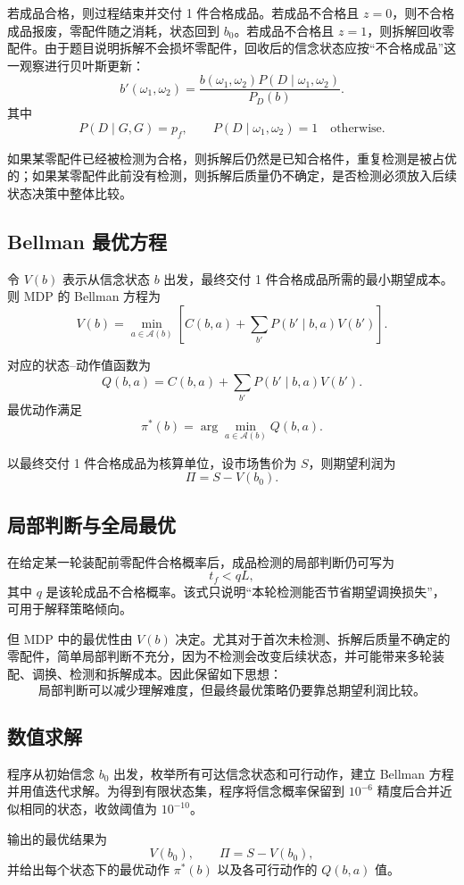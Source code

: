 若成品合格，则过程结束并交付 1 件合格成品。若成品不合格且 \(z=0\)，则不合格成品报废，零配件随之消耗，状态回到 \(b_0\)。若成品不合格且 \(z=1\)，则拆解回收零配件。由于题目说明拆解不会损坏零配件，回收后的信念状态应按“不合格成品”这一观察进行贝叶斯更新：
\[
b'(\omega_1,\omega_2)
=
\frac{
b(\omega_1,\omega_2)P(D\mid \omega_1,\omega_2)
}{
P_D(b)
}.
\]
其中
\[
P(D\mid G,G)=p_f,\qquad
P(D\mid \omega_1,\omega_2)=1\quad \text{otherwise}.
\]

如果某零配件已经被检测为合格，则拆解后仍然是已知合格件，重复检测是被占优的；如果某零配件此前没有检测，则拆解后质量仍不确定，是否检测必须放入后续状态决策中整体比较。

\subsection{Bellman 最优方程}

令 \(V(b)\) 表示从信念状态 \(b\) 出发，最终交付 1 件合格成品所需的最小期望成本。则 MDP 的 Bellman 方程为
\[
V(b)
=
\min_{a\in\mathcal A(b)}
\left[
C(b,a)+
\sum_{b'}P(b'\mid b,a)V(b')
\right].
\]

对应的状态--动作值函数为
\[
Q(b,a)
=
C(b,a)+
\sum_{b'}P(b'\mid b,a)V(b').
\]
最优动作满足
\[
\pi^\ast(b)=\arg\min_{a\in\mathcal A(b)}Q(b,a).
\]

以最终交付 1 件合格成品为核算单位，设市场售价为 \(S\)，则期望利润为
\[
\Pi=S-V(b_0).
\]

\subsection{局部判断与全局最优}

在给定某一轮装配前零配件合格概率后，成品检测的局部判断仍可写为
\[
t_f<qL,
\]
其中 \(q\) 是该轮成品不合格概率。该式只说明“本轮检测能否节省期望调换损失”，可用于解释策略倾向。

但 MDP 中的最优性由 \(V(b)\) 决定。尤其对于首次未检测、拆解后质量不确定的零配件，简单局部判断不充分，因为不检测会改变后续状态，并可能带来多轮装配、调换、检测和拆解成本。因此保留如下思想：
\[
\boxed{\text{局部判断可以减少理解难度，但最终最优策略仍要靠总期望利润比较。}}
\]

\subsection{数值求解}

程序从初始信念 \(b_0\) 出发，枚举所有可达信念状态和可行动作，建立 Bellman 方程并用值迭代求解。为得到有限状态集，程序将信念概率保留到 \(10^{-6}\) 精度后合并近似相同的状态，收敛阈值为 \(10^{-10}\)。

输出的最优结果为
\[
V(b_0),\qquad \Pi=S-V(b_0),
\]
并给出每个状态下的最优动作 \(\pi^\ast(b)\) 以及各可行动作的 \(Q(b,a)\) 值。
